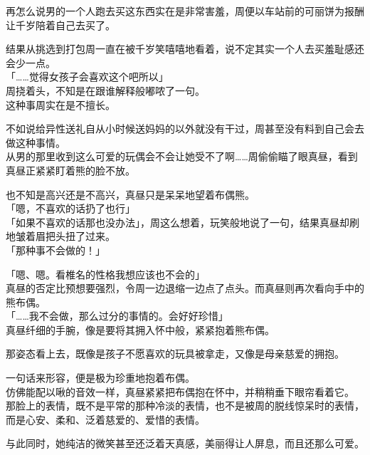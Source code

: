 再怎么说男的一个人跑去买这东西实在是非常害羞，周便以车站前的可丽饼为报酬让千岁陪着自己去买了。

结果从挑选到打包周一直在被千岁笑嘻嘻地看着，说不定其实一个人去买羞耻感还会少一点。\\

「……觉得女孩子会喜欢这个吧所以」\\

周挠着头，不知是在跟谁解释般嘟哝了一句。\\

这种事周实在是不擅长。

不如说给异性送礼自从小时候送妈妈的以外就没有干过，周甚至没有料到自己会去做这种事情。\\

从男的那里收到这么可爱的玩偶会不会让她受不了啊……周偷偷瞄了眼真昼，看到真昼正紧紧盯着熊的脸不放。

也不知是高兴还是不高兴，真昼只是呆呆地望着布偶熊。\\

「嗯，不喜欢的话扔了也行」\\

「如果不喜欢的话那也没办法」，周这么想着，玩笑般地说了一句，结果真昼却刷地皱着眉把头扭了过来。\\

「那种事不会做的！」

「嗯、嗯。看椎名的性格我想应该也不会的」\\

真昼的否定比预想要强烈，令周一边退缩一边点了点头。而真昼则再次看向手中的熊布偶。\\

「……我不会做，那么过分的事情的。会好好珍惜」\\

真昼纤细的手腕，像是要将其拥入怀中般，紧紧抱着熊布偶。

那姿态看上去，既像是孩子不愿喜欢的玩具被拿走，又像是母亲慈爱的拥抱。

一句话来形容，便是极为珍重地抱着布偶。\\

仿佛能配以啾的音效一样，真昼紧紧把布偶抱在怀中，并稍稍垂下眼帘看着它。\\

那脸上的表情，既不是平常的那种冷淡的表情，也不是被周的脱线惊呆时的表情，而是心安、柔和、泛着慈爱的、爱惜的表情。

与此同时，她纯洁的微笑甚至还泛着天真感，美丽得让人屏息，而且还那么可爱。\\


